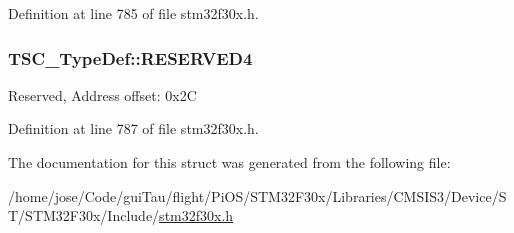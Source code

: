 Definition at line 785 of file stm32f30x.\-h.

\hypertarget{struct_t_s_c___type_def_a75a37e293ded1627c94cf521df950e31}{
\subsubsection[{R\-E\-S\-E\-R\-V\-E\-D4}]{ T\-S\-C\-\_\-\-Type\-Def\-::\-R\-E\-S\-E\-R\-V\-E\-D4}}\label{struct_t_s_c___type_def_a75a37e293ded1627c94cf521df950e31}
Reserved, Address offset\-: 0x2\-C 

Definition at line 787 of file stm32f30x.\-h.



The documentation for this struct was generated from the following file\-:\begin{DoxyCompactItemize}
\item 
/home/jose/\-Code/gui\-Tau/flight/\-Pi\-O\-S/\-S\-T\-M32\-F30x/\-Libraries/\-C\-M\-S\-I\-S3/\-Device/\-S\-T/\-S\-T\-M32\-F30x/\-Include/\hyperlink{stm32f30x_8h}{stm32f30x.\-h}\end{DoxyCompactItemize}
